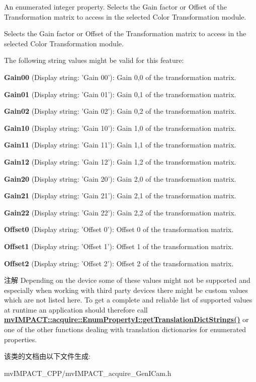 An enumerated integer property. Selects the Gain factor or Offset of the Transformation matrix to access in the selected Color Transformation module. 

Selects the Gain factor or Offset of the Transformation matrix to access in the selected Color Transformation module.

The following string values might be valid for this feature\+:
\begin{DoxyItemize}
\item {\bfseries Gain00} (Display string\+: 'Gain 00')\+: Gain 0,0 of the transformation matrix.
\item {\bfseries Gain01} (Display string\+: 'Gain 01')\+: Gain 0,1 of the transformation matrix.
\item {\bfseries Gain02} (Display string\+: 'Gain 02')\+: Gain 0,2 of the transformation matrix.
\item {\bfseries Gain10} (Display string\+: 'Gain 10')\+: Gain 1,0 of the transformation matrix.
\item {\bfseries Gain11} (Display string\+: 'Gain 11')\+: Gain 1,1 of the transformation matrix.
\item {\bfseries Gain12} (Display string\+: 'Gain 12')\+: Gain 1,2 of the transformation matrix.
\item {\bfseries Gain20} (Display string\+: 'Gain 20')\+: Gain 2,0 of the transformation matrix.
\item {\bfseries Gain21} (Display string\+: 'Gain 21')\+: Gain 2,1 of the transformation matrix.
\item {\bfseries Gain22} (Display string\+: 'Gain 22')\+: Gain 2,2 of the transformation matrix.
\item {\bfseries Offset0} (Display string\+: 'Offset 0')\+: Offset 0 of the transformation matrix.
\item {\bfseries Offset1} (Display string\+: 'Offset 1')\+: Offset 1 of the transformation matrix.
\item {\bfseries Offset2} (Display string\+: 'Offset 2')\+: Offset 2 of the transformation matrix.
\end{DoxyItemize}

\begin{DoxyNote}{注解}
Depending on the device some of these values might not be supported and especially when working with third party devices there might be custom values which are not listed here. To get a complete and reliable list of supported values at runtime an application should therefore call {\bfseries \hyperlink{classmv_i_m_p_a_c_t_1_1acquire_1_1_enum_property_i_a0ba6ccbf5ee69784d5d0b537924d26b6}{mv\+I\+M\+P\+A\+C\+T\+::acquire\+::\+Enum\+Property\+I\+::get\+Translation\+Dict\+Strings()}} or one of the other functions dealing with translation dictionaries for enumerated properties. 
\end{DoxyNote}


该类的文档由以下文件生成\+:\begin{DoxyCompactItemize}
\item 
mv\+I\+M\+P\+A\+C\+T\+\_\+\+C\+P\+P/mv\+I\+M\+P\+A\+C\+T\+\_\+acquire\+\_\+\+Gen\+I\+Cam.\+h\end{DoxyCompactItemize}
